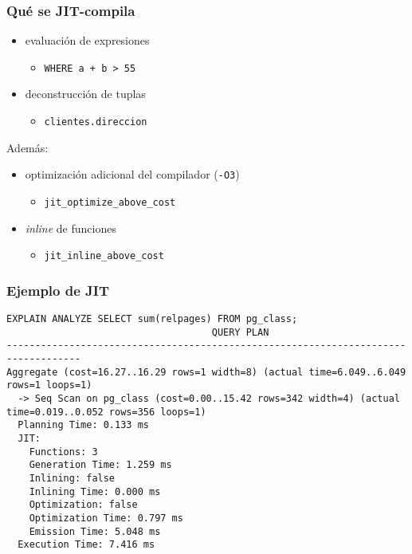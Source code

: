 \begin{frame}
  \frametitle{Qué se JIT-compila}

  \begin{itemize}
    \item evaluación de expresiones
      \begin{itemize}
	\item \texttt{WHERE a + b > 55}
      \end{itemize}
    \item deconstrucción de tuplas
      \begin{itemize}
	\item \texttt{clientes.direccion}
      \end{itemize}
  \end{itemize}

  Además:
  \begin{itemize}
    \item optimización adicional del compilador (\texttt{-O3})
      \begin{itemize}
	\item \texttt{jit\_optimize\_above\_cost}
      \end{itemize}
    \item \emph{inline} de funciones
      \begin{itemize}
	\item \texttt{jit\_inline\_above\_cost}
      \end{itemize}
  \end{itemize}

\end{frame}

\begin{frame}[fragile]
  \frametitle{Ejemplo de JIT}

\footnotesize
\begin{lstlisting}
EXPLAIN ANALYZE SELECT sum(relpages) FROM pg_class;
                                    QUERY PLAN
-----------------------------------------------------------------------------------
Aggregate (cost=16.27..16.29 rows=1 width=8) (actual time=6.049..6.049 rows=1 loops=1)
  -> Seq Scan on pg_class (cost=0.00..15.42 rows=342 width=4) (actual time=0.019..0.052 rows=356 loops=1)
  Planning Time: 0.133 ms
  JIT:
    Functions: 3
    Generation Time: 1.259 ms
    Inlining: false
    Inlining Time: 0.000 ms
    Optimization: false
    Optimization Time: 0.797 ms
    Emission Time: 5.048 ms
  Execution Time: 7.416 ms
\end{lstlisting}

\end{frame}

